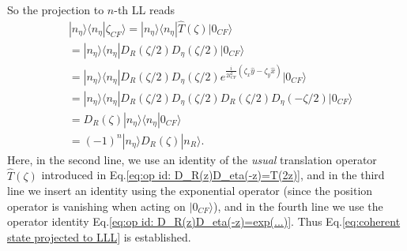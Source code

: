 \begin{subappendices}
    So the projection to $n$-th LL reads
    \begin{align}
         & |n_\eta\rangle\langle n_\eta|\zeta_{CF}\rangle=|n_\eta\rangle\langle n_\eta|\hat T(\zeta)|0_{CF}\rangle\nonumber                       \\
         & = |n_\eta\rangle\langle n_\eta| D_R(\zeta/2)D_\eta(\zeta/2)|0_{CF}\rangle\nonumber                                                     \\
         & =|n_\eta\rangle\langle n_\eta| D_R(\zeta/2)D_\eta(\zeta/2) e^{\frac{i}{2l_{CF}^2}(\zeta_x\hat y-\zeta_y\hat x)}|0_{CF}\rangle\nonumber \\
         & =|n_\eta\rangle\langle n_\eta| D_R(\zeta/2)D_\eta(\zeta/2) D_R(\zeta/2)D_\eta(-\zeta/2)|0_{CF}\rangle\nonumber                         \\
         & =D_R(\zeta)|n_\eta\rangle\langle n_\eta|0_{CF}\rangle\nonumber                                                                         \\
         & =(-1)^n|n_\eta\rangle D_R(\zeta)|n_R\rangle.
    \end{align}
    Here, in the second line, we use an identity of the \emph{usual} translation operator $\hat T(\zeta)$ introduced in Eq.\eqref{eq:op id: D_R(z)D_eta(-z)=T(2z)}, and in the third line we insert an identity using the exponential operator (since the position operator is vanishing when acting on $|0_{CF}\rangle$), and in the fourth line we use the operator identity Eq.\eqref{eq:op id: D_R(z)D_eta(-z)=exp(...)}. Thus Eq.\eqref{eq:coherent state projected to LLL} is established.



\end{subappendices}
